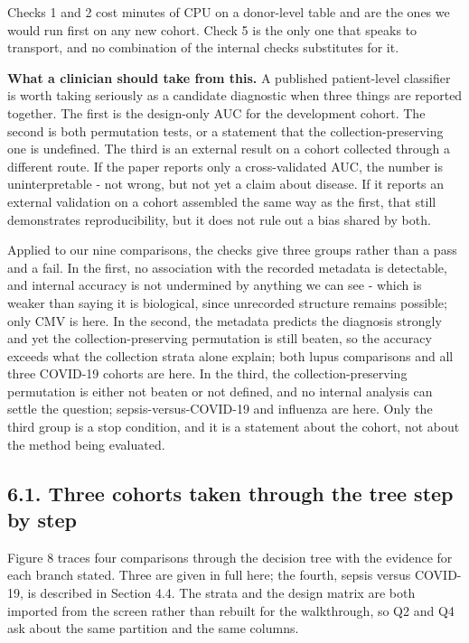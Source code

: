 Checks 1 and 2 cost minutes of CPU on a donor-level table and are the ones we would run first on any new cohort. Check 5 is the only one that speaks to transport, and no combination of the internal checks substitutes for it.

\textbf{What a clinician should take from this.} A published patient-level classifier is worth taking seriously as a candidate diagnostic when three things are reported together. The first is the design-only AUC for the development cohort. The second is both permutation tests, or a statement that the collection-preserving one is undefined. The third is an external result on a cohort collected through a different route. If the paper reports only a cross-validated AUC, the number is uninterpretable - not wrong, but not yet a claim about disease. If it reports an external validation on a cohort assembled the same way as the first, that still demonstrates reproducibility, but it does not rule out a bias shared by both.

Applied to our nine comparisons, the checks give three groups rather than a pass and a fail. In the first, no association with the recorded metadata is detectable, and internal accuracy is not undermined by anything we can see - which is weaker than saying it is biological, since unrecorded structure remains possible; only CMV is here. In the second, the metadata predicts the diagnosis strongly and yet the collection-preserving permutation is still beaten, so the accuracy exceeds what the collection strata alone explain; both lupus comparisons and all three COVID-19 cohorts are here. In the third, the collection-preserving permutation is either not beaten or not defined, and no internal analysis can settle the question; sepsis-versus-COVID-19 and influenza are here. Only the third group is a stop condition, and it is a statement about the cohort, not about the method being evaluated.

\subsection{6.1. Three cohorts taken through the tree step by step}\label{three-cohorts-taken-through-the-tree-step-by-step}

Figure 8 traces four comparisons through the decision tree with the evidence for each branch stated. Three are given in full here; the fourth, sepsis versus COVID-19, is described in Section 4.4. The strata and the design matrix are both imported from the screen rather than rebuilt for the walkthrough, so Q2 and Q4 ask about the same partition and the same columns.

